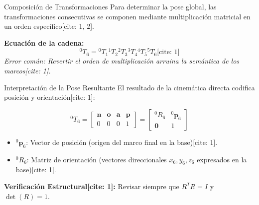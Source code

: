 \documentclass[aspectratio=169, table, xcdraw]{beamer}
\begin{document}
\begin{frame}{Composición de Transformaciones}
    Para determinar la pose global, las transformaciones consecutivas se componen mediante multiplicación matricial en un orden específico[cite: 1, 2].

    \begin{center}
    \end{center}

    \vspace{0.2cm}
    \textbf{Ecuación de la cadena:}
    \begin{equation*}
        \boxed{ {}^{0}T_6 = {}^{0}T_1 {}^{1}T_2 {}^{2}T_3 {}^{3}T_4 {}^{4}T_5 {}^{5}T_6 } \text{[cite: 1]}
    \end{equation*}
    \textit{Error común: Revertir el orden de multiplicación arruina la semántica de los marcos[cite: 1].}
\end{frame}

\begin{frame}{Interpretación de la Pose Resultante}
    El resultado de la cinemática directa codifica posición y orientación[cite: 1]:
    
    \begin{equation*}
        {}^{0}T_6 =
        \begin{bmatrix}
        \mathbf{n} & \mathbf{o} & \mathbf{a} & \mathbf{p} \\
        0 & 0 & 0 & 1
        \end{bmatrix}
        =
        \begin{bmatrix}
        {}^{0}R_6 & {}^{0}\mathbf{p}_6 \\
        \mathbf{0} & 1
        \end{bmatrix}
    \end{equation*}

    \begin{itemize}
        \item ${}^{0}\mathbf{p}_6$: Vector de posición (origen del marco final en la base)[cite: 1].
        \item ${}^{0}R_6$: Matriz de orientación (vectores direccionales $x_6, y_6, z_6$ expresados en la base)[cite: 1].
    \end{itemize}

    \textbf{Verificación Estructural[cite: 1]:}
    Revisar siempre que $R^T R = I$ y $\det(R) = 1$.
\end{frame}
\end{document}
